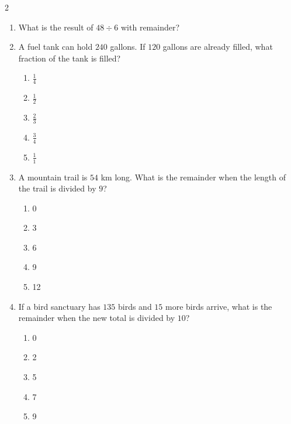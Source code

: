 \documentclass[10pt]{article}
\begin{document}
\begin{multicols}{2}
\begin{enumerate}[label=\textbf{Q\arabic*.}, leftmargin=*, itemsep=6pt, parsep=0pt]
  \item \small What is the result of $48 \div 6$ with remainder?

  \item \small A fuel tank can hold $240$ gallons. If $120$ gallons are already filled, what fraction of the tank is filled?
  \begin{enumerate}[label=(\Alph*), leftmargin=0.6cm, nosep, itemsep=2pt]
    \item $$
    \item $$
    \item $$
    \item $$
    \item $$
  \end{enumerate}

  \item \small A mountain trail is $54$ km long. What is the remainder when the length of the trail is divided by $9$?
  \begin{enumerate}[label=(\Alph*), leftmargin=0.6cm, nosep, itemsep=2pt]
    \item 0
    \item 3
    \item 6
    \item 9
    \item 12
  \end{enumerate}

  \item \small If a bird sanctuary has $135$ birds and $15$ more birds arrive, what is the remainder when the new total is divided by $10$?
  \begin{enumerate}[label=(\Alph*), leftmargin=0.6cm, nosep, itemsep=2pt]
    \item 0
    \item 2
    \item 5
    \item 7
    \item 9
  \end{enumerate}


\end{enumerate}
\end{multicols}
\end{document}
